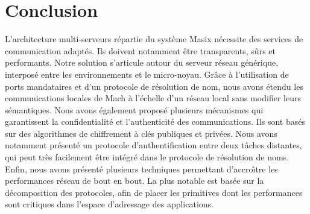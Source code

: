 \section{Conclusion}

L'architecture multi-serveurs r\'epartie du syst\`eme Masix n\'ecessite 
des services de communication adapt\'es. Ils doivent notamment \^etre transparents, s\^urs et performants.
Notre solution s'articule autour du serveur r\'eseau g\'en\'erique, interpos\'e entre les environnements et le micro-noyau. Gr\^ace \`a l'utilisation de ports mandataires et d'un protocole de r\'esolution de nom, nous avons \'etendu les communications locales de Mach \`a l'\'echelle d'un r\'eseau local sans modifier leurs s\'emantiques.
Nous avons \'egalement propos\'e plusieurs m\'ecanismes qui garantissent la confidentialit\'e et l'authenticit\'e des communications. Ils sont bas\'es sur des algorithmes de chiffrement \`a cl\'es publiques et priv\'ees. Nous avons notamment pr\'esent\'e un protocole d'authentification entre deux t\^aches distantes, qui peut tr\`es facilement \^etre int\'egr\'e dans le protocole de r\'esolution de noms.
Enfin, nous avons pr\'esent\'e plusieurs techniques permettant d'accro\^{\i}tre les performances r\'eseau de bout en bout. La plus notable est bas\'ee sur la 
d\'ecomposition des protocoles, afin de placer les primitives dont les 
performances sont critiques dans l'espace d'adressage des applications.







